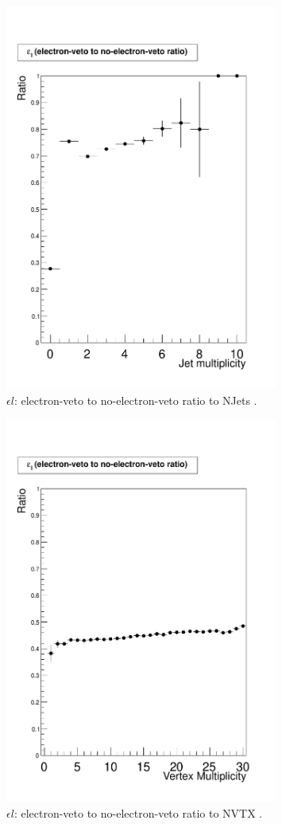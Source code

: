 \documentclass[12pt,oneandhalf,chaparabic,phys,ms,eng]{metu}
\begin{document}
\begin{figure}[!hbt]
\centering
    \includegraphics[width=0.8\textwidth]{FakeRateRatio_NJets}
    \caption{\label{FJet} $\epsilon l$: electron-veto to no-electron-veto ratio to NJets .}
\end{figure}

\begin{figure}[!hbt]
\centering
    \includegraphics[width=0.8\textwidth]{FakeRateRatio_NVTX}
    \caption{\label{FNVTX} $\epsilon l$: electron-veto to no-electron-veto ratio to NVTX .}
\end{figure}
\end{document}
